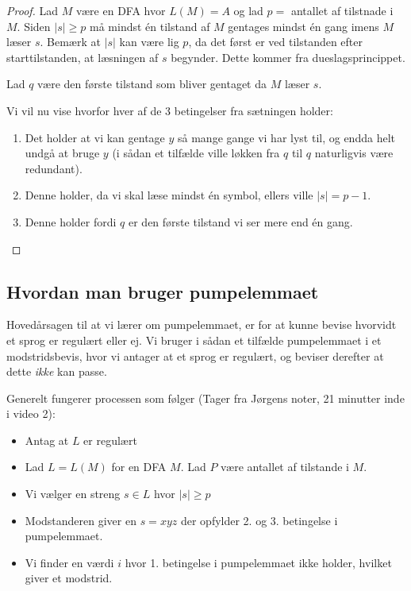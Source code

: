 \begin{proof}
	Lad $M$ være en DFA hvor $L(M) = A$ og lad $p = $ antallet af tilstnade i $M$.
	Siden $|s| \ge p$ må mindst én tilstand af $M$ gentages mindst én gang imens $M$ læser $s$. Bemærk at $|s|$ kan være lig $p$, da det først er ved tilstanden efter starttilstanden, at læsningen af $s$ begynder. Dette kommer fra dueslagsprincippet.

	Lad $q$ være den første tilstand som bliver gentaget da $M$ læser $s$.

	\begin{center}
	\end{center}
	Vi vil nu vise hvorfor hver af de 3 betingelser fra sætningen holder:

	\begin{enumerate}
		\item Det holder at vi kan gentage $y$ så mange gange vi har lyst til, og endda helt undgå at bruge $y$ (i sådan et tilfælde ville løkken fra $q$ til $q$ naturligvis være redundant).
		\item Denne holder, da vi skal læse mindst én symbol, ellers ville $|s| = p-1$.
		\item Denne holder fordi $q$ er den første tilstand vi ser mere end én gang.
	\end{enumerate}
\end{proof}

\subsection{Hvordan man bruger pumpelemmaet}%
\label{subsec:label}

Hovedårsagen til at vi lærer om pumpelemmaet, er for at kunne bevise hvorvidt et sprog er regulært eller ej. Vi bruger i sådan et tilfælde pumpelemmaet i et modstridsbevis, hvor vi antager at et sprog er regulært, og beviser derefter at dette \textit{ikke} kan passe.

Generelt fungerer processen som følger (Tager fra Jørgens noter, 21 minutter inde i video 2):
\begin{itemize}
	\item Antag at $L$ er regulært
	\item Lad $L = L(M)$ for en DFA $M$. Lad $P$ være antallet af tilstande i $M$.
	\item Vi vælger en streng $s \in L$ hvor $|s| \ge p$
	\item Modstanderen giver en $s = xyz$ der opfylder 2. og 3. betingelse i pumpelemmaet.
	\item Vi finder en værdi $i$ hvor 1. betingelse i pumpelemmaet ikke holder, hvilket giver et modstrid.
\end{itemize}

